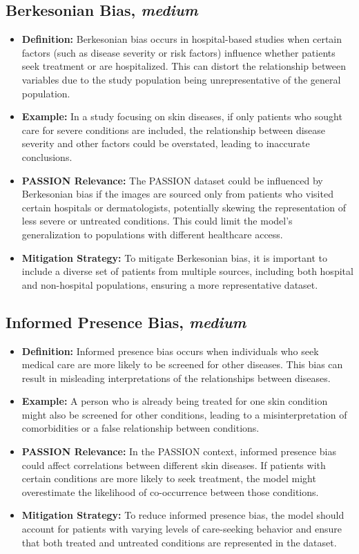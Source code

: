 \begin{refsection}
		\subsection{Berkesonian Bias, \textit{medium}}
		\begin{itemize}
			\item \textbf{Definition:} Berkesonian bias occurs in hospital-based studies when certain factors (such as disease severity or risk factors) influence whether patients seek treatment or are hospitalized. This can distort the relationship between variables due to the study population being unrepresentative of the general population.
			\item \textbf{Example:} In a study focusing on skin diseases, if only patients who sought care for severe conditions are included, the relationship between disease severity and other factors could be overstated, leading to inaccurate conclusions.
			\item \textbf{PASSION Relevance:} The PASSION dataset could be influenced by Berkesonian bias if the images are sourced only from patients who visited certain hospitals or dermatologists, potentially skewing the representation of less severe or untreated conditions. This could limit the model's generalization to populations with different healthcare access.
			\item \textbf{Mitigation Strategy:} To mitigate Berkesonian bias, it is important to include a diverse set of patients from multiple sources, including both hospital and non-hospital populations, ensuring a more representative dataset.
		\end{itemize}
		
		\subsection{Informed Presence Bias, \textit{medium}}
		\begin{itemize}
			\item \textbf{Definition:} Informed presence bias occurs when individuals who seek medical care are more likely to be screened for other diseases. This bias can result in misleading interpretations of the relationships between diseases.
			\item \textbf{Example:} A person who is already being treated for one skin condition might also be screened for other conditions, leading to a misinterpretation of comorbidities or a false relationship between conditions.
			\item \textbf{PASSION Relevance:} In the PASSION context, informed presence bias could affect correlations between different skin diseases. If patients with certain conditions are more likely to seek treatment, the model might overestimate the likelihood of co-occurrence between those conditions.
			\item \textbf{Mitigation Strategy:} To reduce informed presence bias, the model should account for patients with varying levels of care-seeking behavior and ensure that both treated and untreated conditions are represented in the dataset.
		\end{itemize}
		

\end{refsection}
